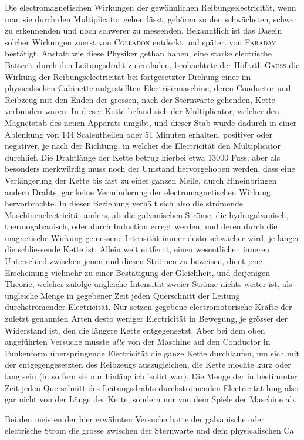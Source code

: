 Die electromagnetischen Wirkungen der gewöhnlichen Reibungselectricität, wenn man sie durch den Multiplicator gehen lässt, gehören zu den schwächsten, schwer zu erkennenden und noch schwerer zu messenden. Bekanntlich ist das
Dasein solcher Wirkungen zuerst von \textsc{Colladon} entdeckt und später. von \textsc{Faraday} bestätigt. Anstatt wie diese Physiker gethan haben, eine starke electrische Batterie durch den Leitungsdraht zu entladen, beobachtete der Hofrath \textsc{Gauss} die Wirkung der Reibungselectricität bei fortgesetzter Drehung einer im physicalischen Cabinette aufgestellten Electrisirmaschine, deren Conductor und Reibzeug mit den Enden der grossen, nach der Sternwarte gehenden, Kette verbunden waren. In dieser Kette befand sich der Multiplicator, welcher den Magnetstab des neuen Apparats umgibt, und dieser Stab wurde dadurch in einer Ablenkung von 144 Scalentheilen oder 51 Minuten erhalten, positiver oder negativer, je nach der Richtung, in welcher die Electricität den Multiplicator durchlief. Die Drahtlänge der Kette betrug hierbei etwa 13000 Fuss; aber als besonders merkwürdig muss noch der Umstand hervorgehoben werden, dass eine Verlängerung der Kette bis fast zu einer ganzen Meile, durch Hineinbringen andern Drahts, gar keine Verminderung der electromagnetischen Wirkung hervorbrachte. In dieser Beziehung verhält sich also die strömende Maschinenelectricität anders, als die galvanischen Ströme, die hydrogalvanisch, thermogalvanisch, oder durch Induction erregt werden, und deren durch die magnetische Wirkung gemessene Intensität immer desto schwächer wird, je länger die schliessende Kette ist. Allein weit entfernt, einen wesentlichen inneren Unterschied zwischen jenen und diesen Strömen zu beweisen, dient jene Erscheinung vielmehr zu einer Bestätigung der Gleichheit, und derjenigen Theorie, welcher zufolge ungleiche Intensität zweier Ströme nichts weiter ist, als ungleiche Menge in gegebener Zeit jeden Querschnitt der Leitung durchströmender Electricität. Nur setzen gegebene electromotorische Kräfte der zuletzt genannten Arten desto weniger Electricität in Bewegung, je grösser der Widerstand ist, den die längere Kette entgegensetzt. Aber bei dem oben angeführten Versuche musste \textit{alle} von der Maschine auf den Conductor in Funkenform überspringende Electricität die ganze Kette durchlaufen, um sich mit der entgegengesetzten des Reibzeugs auszugleichen, die Kette mochte kurz oder lang sein (in so fern sie nur hinlänglich isolirt war). Die Menge der in bestimmter Zeit jeden Querschnitt des Leitungsdrahts durchströmenden Electricität hing also gar nicht von der Länge der Kette, sondern nur von dem Spiele der Maschine ab.

Bei den meisten der hier erwähnten Versuche hatte der galvanische oder electrische Strom die grosse zwischen der Sternwarte und dem physicalischen Ca%
